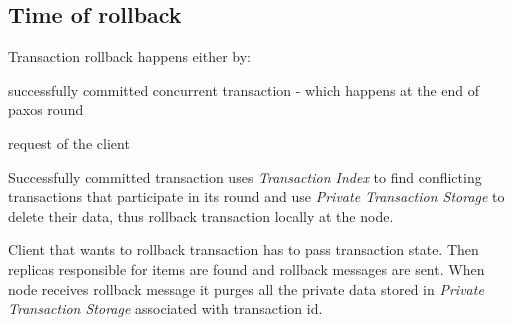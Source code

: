 
\subsection{Time of rollback}
Transaction rollback happens either by:
\begin{enumerate*}
\item successfully committed concurrent transaction - which happens at the end of paxos round
\item request of the client
\end{enumerate*}

Successfully committed transaction uses \emph{Transaction Index} to find conflicting transactions that participate in its round and use \emph{Private Transaction Storage} to delete their data, thus rollback transaction locally at the node.

Client that wants to rollback transaction has to pass transaction state. Then replicas responsible for items are found and rollback messages are sent. When node receives rollback message it purges all the private data stored in \emph{Private Transaction Storage} associated with transaction id.
